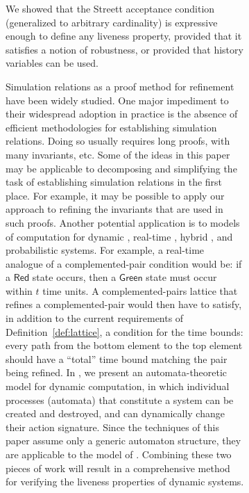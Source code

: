 \documentclass[11pt]{article}
\newcommand{\GREEN}{\mathsf{Green}}
\newcommand{\RED}{\mathsf{Red}}
\begin{document}
\begin{figure}[htb]
\begin{figure}[htb]
We showed that the Streett acceptance condition (generalized to
arbitrary cardinality) is expressive enough to define any liveness
property, provided that it satisfies a notion of robustness, or
provided that history variables can be used.  

Simulation relations as a proof method for refinement have been widely
studied. One major impediment to their widespread adoption in practice
is the absence of efficient methodologies for establishing simulation
relations. Doing so usually requires long proofs, with many invariants,
etc. Some of the ideas in this paper may be applicable to
decomposing and simplifying the task of establishing simulation
relations in the first place. For example, it may be possible to apply
our approach to refining the invariants that are used in such
proofs. Another potential application is to models of computation for
dynamic \cite{ALy01}, real-time \cite{LSVK03}, hybrid \cite{LSV03}, and
probabilistic \cite{S95}  systems.
For example, a real-time analogue of a complemented-pair condition
would be: if a $\RED$ state occurs, then a $\GREEN$ state must occur
within $t$ time units. A complemented-pairs lattice that refines a
complemented-pair would then have to satisfy, in addition to the
current requirements of Definition~\ref{def:lattice}, a condition for
the time bounds: every path from the bottom element to the top element
should have a ``total'' time bound matching the pair being refined.
In \cite{ALy01}, we present an automata-theoretic model for dynamic
computation, in which individual processes (automata) that constitute
a system can be created and destroyed, and can dynamically change
their action signature. Since the techniques of this paper assume only
a generic automaton structure, they are applicable to the model of 
\cite{ALy01}. Combining these two pieces of work will result in a
comprehensive method for verifying the liveness properties of
dynamic systems.











\clearpage









\end{figure}
\end{figure}
\end{document}
